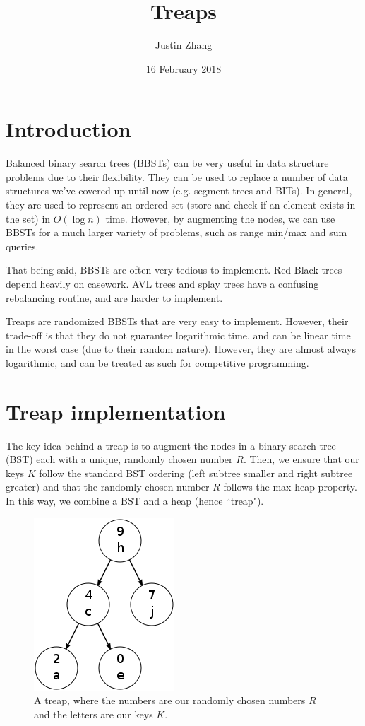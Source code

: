 \documentclass[11pt]{article}
\title{Treaps}
\author{Justin Zhang}
\date{16 February 2018}
\begin{document}
\maketitle


\section{Introduction}

Balanced binary search trees (BBSTs) can be very useful in data structure problems due to their flexibility. They can be used to replace a number of data structures we've covered up until now (e.g. segment trees and BITs). In general, they are used to represent an ordered set (store and check if an element exists in the set) in $O(\log n)$ time. However, by augmenting the nodes, we can use BBSTs for a much larger variety of problems, such as range min/max and sum queries.

That being said, BBSTs are often very tedious to implement. Red-Black trees depend heavily on casework. AVL trees and splay trees have a confusing rebalancing routine, and are harder to implement.

Treaps are randomized BBSTs that are very easy to implement. However, their trade-off is that they do not guarantee logarithmic time, and can be linear time in the worst case (due to their random nature). However, they are almost always logarithmic, and can be treated as such for competitive programming.

\section{Treap implementation}

The key idea behind a treap is to augment the nodes in a binary search tree (BST) each with a unique, randomly chosen number $R$. Then, we ensure that our keys $K$ follow the standard BST ordering (left subtree smaller and right subtree greater) and that the randomly chosen number $R$ follows the max-heap property. In this way, we combine a BST and a heap (hence ``treap").


    \begin{figure}[H]
        \centerline{\includegraphics[scale=0.5]{treap.png}}
        \caption{A treap, where the numbers are our randomly chosen numbers $R$ and the letters are our keys $K$.}
        \label{fig:treap}
    \end{figure}
    
\end{document}
